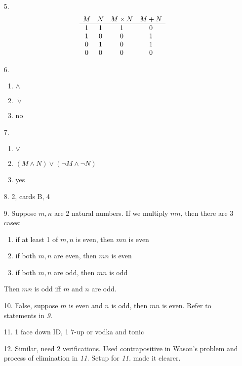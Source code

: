 \documentclass[11pt]{exam}
\begin{document}
\begin{enumerate}[leftmargin=0pt]
\item[5.]
\begin{displaymath}
    \begin{array}{c c c c}
    M & N & M \times N & M + N \\
    \hline
    1 & 1 & 1 & 0 \\
    1 & 0 & 0 & 1 \\
    0 & 1 & 0 & 1 \\
    0 & 0 & 0 & 0
    \end{array}
\end{displaymath}

\item[6.]
\begin{enumerate}[label=(\alph*)]
    \item $\land$
    \item $\dot \lor$
    \item no
\end{enumerate}

\item[7.]
\begin{enumerate}[label=(\alph*)]
    \item $\lor$
    \item $(M \land N) \lor ( \neg M \land \neg N)$
    \item yes
\end{enumerate}

\item[8.] 2, cards B, 4

\item[9.]
Suppose $m,n$ are 2 natural numbers. If we multiply $mn$, then there are 3 cases:
\begin{enumerate}
    \item if at least 1 of $m, n$ is even, then $mn$ is even
    \item if both $m, n$ are even, then $mn$ is even
    \item if both $m, n$ are odd, then $mn$ is odd
\end{enumerate}
Then $mn$ is odd iff $m$ and $n$ are odd.

\item[10.] False, suppose $m$ is even and $n$ is odd, then $mn$ is even. Refer to statements in \emph{9.}

\item[11.] 1 face down ID, 1 7-up or vodka and tonic

\item[12.] Similar, need 2 verifications. Used contrapositive in Wason's problem and process of elimination in \emph{11.} Setup for \emph{11.} made it clearer.

\end{enumerate}
\end{document}
